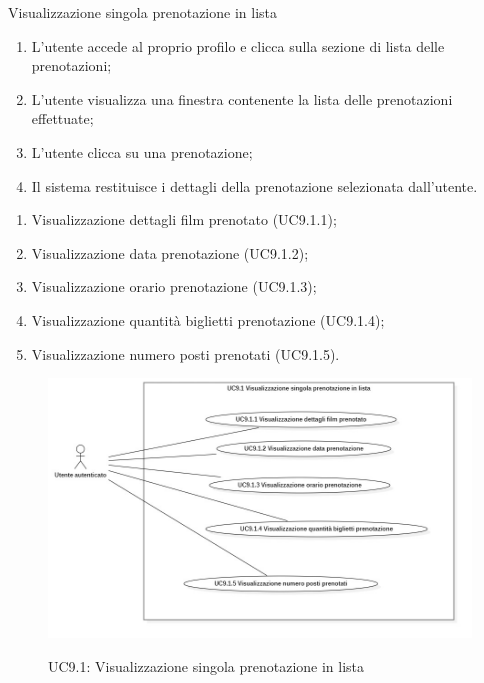 \begin{usecase}{9.1}{Visualizzazione singola prenotazione in lista}\label{uc:lista-prenotazioni-singola}
    \usecasemain{}
    
    \begin{enumerate}
      \item L'utente accede al proprio profilo e clicca sulla sezione di lista delle prenotazioni;
      \item L'utente visualizza una finestra contenente la lista delle prenotazioni effettuate;
      \item L'utente clicca su una prenotazione;
      \item Il sistema restituisce i dettagli della prenotazione selezionata dall'utente.
    \end{enumerate}

    \begin{enumerate}
      \item Visualizzazione dettagli film prenotato (UC9.1.1);
      \item Visualizzazione data prenotazione (UC9.1.2);
      \item Visualizzazione orario prenotazione (UC9.1.3);
      \item Visualizzazione quantità biglietti prenotazione (UC9.1.4);
      \item Visualizzazione numero posti prenotati (UC9.1.5).
    \end{enumerate}
\end{usecase}

\begin{figure}[!ht] 
  \centering 
  \includegraphics[width=0.9\columnwidth, alt={Caso d'uso relativo alla visualizzazione della singola prenotazione nella lista dell'utente}]{immagini/usecase/UC9.1.jpg}
  \caption{UC9.1: Visualizzazione singola prenotazione in lista}\label{fig:uc:lista-prenotazioni-singola}
\end{figure}

